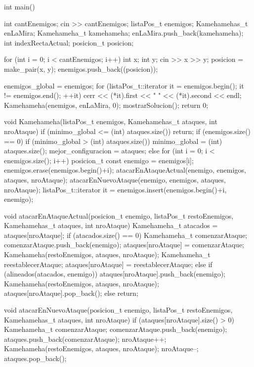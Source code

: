 \documentclass[10pt,a4paper]{article}
\begin{document}
int main() {
    int cantEnemigos;
    cin >> cantEnemigos;
    listaPos_t enemigos;
    Kamehamehas_t enLaMira;
    Kamehameha_t kamehameha;
    enLaMira.push_back(kamehameha);
    int indexRectaActual;
    posicion_t posicion;

    for (int i = 0; i < cantEnemigos; i++) {
        int x;
        int y;
        cin >> x >> y;
    	posicion = make_pair(x, y);
    	enemigos.push_back((posicion));
    }

    enemigos_global = enemigos;
    for (listaPos_t::iterator it = enemigos.begin(); it != enemigos.end(); ++it) {
            cerr << (*it).first << " " << (*it).second << endl;
    }
    Kamehameha(enemigos, enLaMira, 0);
    mostrarSolucion();
    return 0;
}

void Kamehameha(listaPos_t enemigos, Kamehamehas_t ataques, int nroAtaque) {
    if (minimo_global <= (int) ataques.size()) {
      return;
    }
    if (enemigos.size() == 0) {
        if (minimo_global > (int) ataques.size()) {
            minimo_global = (int) ataques.size();
            mejor_configuracion = ataques;
        }
    } else {
        for (int i = 0; i < enemigos.size(); i++) {
            posicion_t const enemigo = enemigos[i];
            enemigos.erase(enemigos.begin()+i);
            atacarEnAtaqueActual(enemigo, enemigos, ataques, nroAtaque);
            atacarEnNuevoAtaque(enemigo, enemigos, ataques, nroAtaque);
            listaPos_t::iterator it = enemigos.insert(enemigos.begin()+i, enemigo);
        }
    }
}

void atacarEnAtaqueActual(posicion_t enemigo, listaPos_t restoEnemigos, Kamehamehas_t ataques, int nroAtaque) {
    Kamehameha_t atacados = ataques[nroAtaque];
    if (atacados.size() == 0){
        Kamehameha_t comenzarAtaque;
        comenzarAtaque.push_back(enemigo);
        ataques[nroAtaque] = comenzarAtaque;
        Kamehameha(restoEnemigos, ataques, nroAtaque);
        Kamehameha_t reestablecerAtaque;
        ataques[nroAtaque] = reestablecerAtaque;
    } else if (alineados(atacados, enemigo)) {
        ataques[nroAtaque].push_back(enemigo);
        Kamehameha(restoEnemigos, ataques, nroAtaque);
        ataques[nroAtaque].pop_back();
    } else {
        return;
    }
}

void atacarEnNuevoAtaque(posicion_t enemigo, listaPos_t restoEnemigos, Kamehamehas_t ataques, int nroAtaque) {
    if (ataques[nroAtaque].size() > 0) {
        Kamehameha_t comenzarAtaque;
        comenzarAtaque.push_back(enemigo);
        ataques.push_back(comenzarAtaque);
        nroAtaque++;
        Kamehameha(restoEnemigos, ataques, nroAtaque);
        nroAtaque--;
        ataques.pop_back();
    }
}
\end{document}
